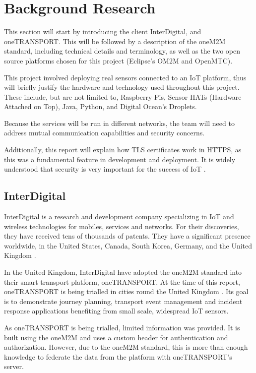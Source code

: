 \chapter{Background Research}

This section will start by introducing the client InterDigital, and oneTRANSPORT. This will be followed by a description of the oneM2M standard, including technical details and terminology, as well as the two open source platforms chosen for this project (Eclipse's OM2M and OpenMTC). 

This project involved deploying real sensors connected to an IoT platform, thus will briefly justify the hardware and technology used throughout this project. These include, but are not limited to, Raspberry Pis, Sensor HATs (Hardware Attached on Top), Java, Python, and Digital Ocean's Droplets.

Because the services will be run in different networks, the team will need to address mutual communication capabilities and security concerns. 

Additionally, this report will explain how TLS certificates work in HTTPS, as this was a fundamental feature in development and deployment. It is widely understood that security is very important for the success of IoT \cite{Zhi-KaiZhang2014IoTOpportunities}.

\section{InterDigital}

InterDigital is a research and development company specializing in IoT and wireless technologies for mobiles, services and networks. For their discoveries, they have received tens of thousands of patents. They have a significant presence worldwide, in the United States, Canada, South Korea, Germany, and the United Kingdom \cite{InterDigital2017InterDigitalFACTS}.

In the United Kingdom, InterDigital have adopted the oneM2M standard into their smart transport platform, oneTRANSPORT. At the time of this report, oneTRANSPORT is being trialled in cities round the United Kingdom \cite{InterDigital2016OneTRANSPORT:Today}. Its goal is to demonstrate journey planning, transport event management and incident response applications benefiting from small scale, widespread IoT sensors.

As oneTRANSPORT is being trialled, limited information was provided. It is built using the oneM2M and uses a custom header for authentication and authorization. However, due to the oneM2M standard, this is more than enough knowledge to federate the data from the platform with oneTRANSPORT's server. 


